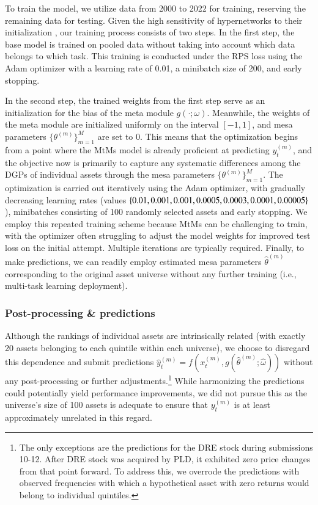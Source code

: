 \documentclass[3p,times,twocolumn]{elsarticle}
\newcommand{\splitatcommas}[1]{%
  \begingroup
  \begingroup\lccode`~=`, \lowercase{\endgroup
    \edef~{\mathchar\the\mathcode`, \penalty0 \noexpand\hspace{0pt plus 1em}}%
  }\mathcode`,="8000 #1%
  \endgroup
}
\begin{document}
To train the model, we utilize data from 2000 to 2022 for training, reserving the remaining data for testing. 
Given the high sensitivity of hypernetworks to their initialization \citep{beckHypernetworksMetaReinforcementLearning2023}, our training process consists of two steps.
In the first step, the base model is trained on pooled data without taking into account which data belongs to which task. 
This training is conducted under the RPS loss using the Adam optimizer with a learning rate of 0.01, a minibatch size of 200, and early stopping.

In the second step, the trained weights from the first step serve as an initialization for the bias of the meta module $g(\cdot; \omega)$. 
Meanwhile, the weights of the meta module are initialized uniformly on the interval $\left[-1, 1\right]$, and mesa parameters $\{\theta^{(m)}\}_{m=1}^{M}$ are set to 0.
This means that the optimization begins from a point where the MtMs model is already proficient at predicting $y_{t}^{(m)}$, and the objective now is primarily to capture any systematic differences among the DGPs of individual assets through the mesa parameters $\{\theta^{(m)}\}_{m=1}^{M}$.
The optimization is carried out iteratively using the Adam optimizer, with gradually decreasing learning rates (values $\splitatcommas{\{0.01,0.001,0.001,0.0005,0.0003,0.0001,0.00005\}}$), minibatches consisting of 100 randomly selected assets and early stopping.
We employ this repeated training scheme because MtMs can be challenging to train, with the optimizer often struggling to adjust the model weights for improved test loss on the initial attempt. 
Multiple iterations are typically required.
Finally, to make predictions, we can readily employ estimated mesa parameters $\hat{\theta}^{(m)}$ corresponding to the original asset universe without any further training (i.e., multi-task learning deployment).

\subsubsection{Post-processing \& predictions}\label{subsection:mtms_predictions}

Although the rankings of individual assets are intrinsically related (with exactly 20 assets belonging to each quintile within each universe), we choose to disregard this dependence and submit predictions $\hat{y}_{t}^{(m)}=f(x_{t}^{(m)},g(\widehat{\theta}^{(m)};\widehat{\omega}))$ without any post-processing or further adjustments.\footnote{
    The only exceptions are the predictions for the DRE stock during submissions 10-12. 
    After DRE stock was acquired by PLD, it exhibited zero price changes from that point forward. 
    To address this, we overrode the predictions with observed frequencies with which a hypothetical asset with zero returns would belong to individual quintiles.
}
While harmonizing the predictions could potentially yield performance improvements, we did not pursue this as the universe's size of 100 assets is adequate to ensure that $y_{t}^{(m)}$ is at least approximately unrelated in this regard.
\end{document}
